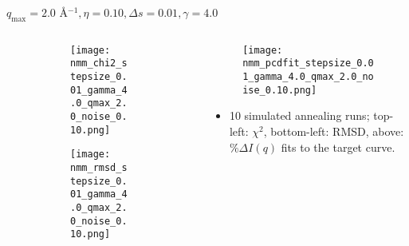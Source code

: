 \documentclass{beamer}
\begin{document}
\begin{frame}{$ q_{\textrm{max}}=2.0 $ \AA $^{-1}, \eta=0.10, \Delta s=0.01, \gamma=4.0$}
	\begin{columns}
		\begin{column}{.5\textwidth}
			\begin{figure}[H]
			\centering
			\begin{subfigure}[b]{\textwidth}
				\centering
				\texttt{[image: nmm\_chi2\_stepsize\_0.01\_gamma\_4.0\_qmax\_2.0\_noise\_0.10.png]}
				\label{fig:}
			\end{subfigure}
			\begin{subfigure}[b]{\textwidth}
				\centering
				\texttt{[image: nmm\_rmsd\_stepsize\_0.01\_gamma\_4.0\_qmax\_2.0\_noise\_0.10.png]}
				\label{fig:}
			\end{subfigure}
			\end{figure}
		\end{column}
		\begin{column}{.5\textwidth}
			\begin{figure}[H]
				\centering
				\texttt{[image: nmm\_pcdfit\_stepsize\_0.01\_gamma\_4.0\_qmax\_2.0\_noise\_0.10.png]}
				\label{fig:}
			\end{figure}
			\begin{itemize}
				\item 10 simulated annealing runs; top-left: $\chi^2$, bottom-left: RMSD, above: $\%\Delta I(q)$ fits to the target curve.
			\end{itemize}
		\end{column}
	\end{columns}
\end{frame}
 
\end{document}
